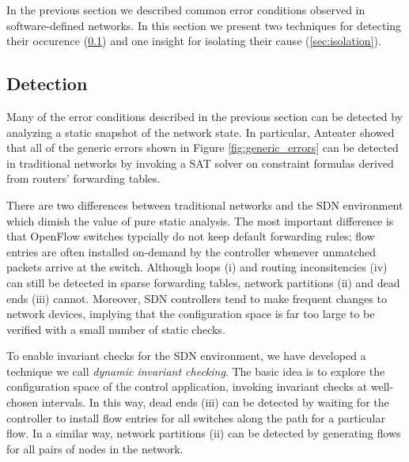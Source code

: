 
In the previous section we described common error conditions observed in
software-defined networks. In this section we present two techniques for
detecting their occurence (\ref{sec:detection}) and one insight for isolating their cause
(\ref{sec:isolation}).

\subsection{Detection}
\label{sec:detection}

Many of the error conditions described in the previous section can be detected
by analyzing a static snapshot of the network state. In particular, Anteater \cite{anteater}
showed that all of the generic errors shown in Figure
\ref{fig:generic_errors} can be detected in traditional networks by invoking a
SAT solver on constraint formulas derived from routers' forwarding tables.

There are two differences between traditional networks and the SDN environment
which dimish the value of pure static analysis. The most important
difference is that OpenFlow switches typcially do not keep default forwarding
rules; flow entries are often installed on-demand by the controller
whenever unmatched packets arrive at the switch. Although loops (i) and
routing inconsitencies (iv) can still be detected in sparse forwarding tables,
network partitions  (ii)
and dead ends (iii) cannot. Moreover, SDN controllers tend to make frequent
changes to network devices, implying that the configuration space is far too
large to be verified with a small number of static checks.

To enable invariant checks for the SDN environment, we have developed a
technique we call {\it dynamic invariant checking}. The basic idea is to
explore the configuration space of the control application, invoking
invariant checks at well-chosen intervals. In this way, dead ends (iii) can be
detected by waiting for the controller to install flow entries for all
switches along the path for a particular flow. In a similar way, network
partitions (ii) can be detected by generating flows for all pairs of nodes in
the network. 



